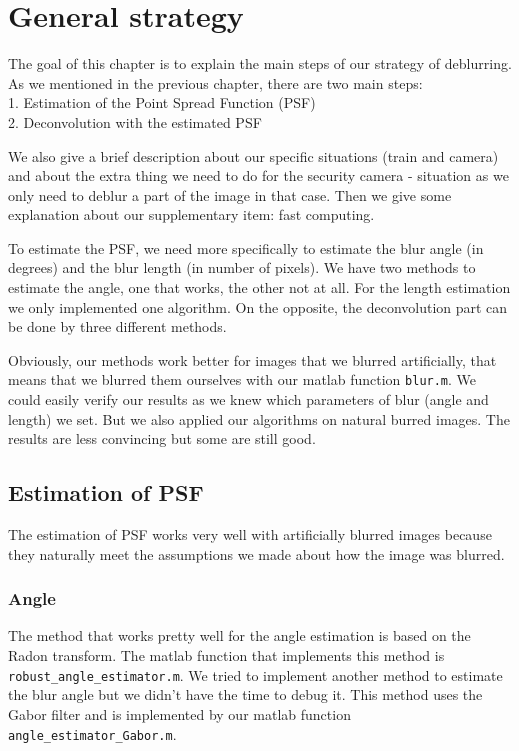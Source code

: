 \chapter{General strategy}

The goal of this chapter is to explain the main steps of our strategy of deblurring. As we mentioned in the previous chapter, there are two main steps:\\
1. Estimation of the Point Spread Function (PSF) \\
2. Deconvolution with the estimated PSF

We also give a brief description about our specific situations (train and camera) and about the extra thing we need to do for the security camera - situation as we only need to deblur a part of the image in that case. Then we give some explanation about our supplementary item: fast computing.

To estimate the PSF, we need more specifically to estimate the blur angle (in degrees) and the blur length (in number of pixels). We have two methods to estimate the angle, one that works, the other not at all. For the length estimation we only implemented one algorithm. On the opposite, the deconvolution part can be done by three different methods. 

Obviously, our methods work better for images that we blurred artificially, that means that we blurred them ourselves with our matlab function \texttt{blur.m}. We could easily verify our results as we knew which parameters of blur (angle and length) we set. But we also applied our algorithms on natural burred images. The results are less convincing but some are still good.
  
\section{Estimation of PSF}

The estimation of PSF works very well with artificially blurred images because they naturally meet the assumptions we made about how the image was blurred.
 
\subsection{Angle}
The method that works pretty well for the angle estimation is based on the Radon transform. The matlab function that implements this method is \texttt{robust_angle_estimator.m}. We tried to implement another method to estimate the blur angle but we didn't have the time to debug it. This method uses the Gabor filter and is implemented by our matlab function \texttt{angle_estimator_Gabor.m}. 

